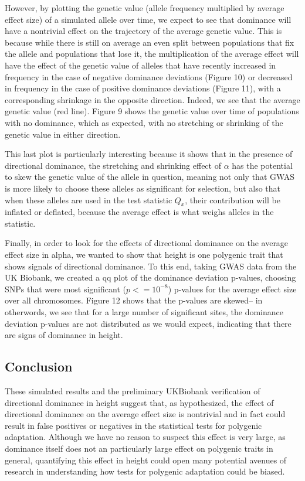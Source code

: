 \documentclass[a4paper,12pt]{article}
\begin{document}
However, by plotting the genetic value (allele frequency multiplied by
average effect size) of a simulated allele over time, we expect to see
that dominance will have a nontrivial effect on the trajectory of the
average genetic value. This is because while there is still on average
an even split between populations that fix the allele and populations
that lose it, the multiplication of the average effect will have the
effect of  the genetic value of alleles that have
recently increased in frequency in the case of negative dominance
deviations (Figure 10) or decreased in frequency in the case of
positive dominance deviations (Figure 11), with a corresponding
shrinkage in the opposite direction. Indeed, we see that the
average genetic value (red line). Figure 9 shows the genetic value
over time of populations with no dominance, which as expected, with no
stretching or shrinking of the genetic value in either direction.

This last plot is particularly interesting because it shows that in
the presence of directional dominance, the stretching and shrinking
effect of $\alpha$ has the potential to skew the genetic value of the
allele in question, meaning not only that GWAS is more likely to
choose these alleles as significant for selection, but also that when
these alleles are used in the test statistic $Q_x$, their contribution
will be inflated or deflated, because the average effect is what
weighs alleles in the statistic.

Finally, in order to look for the effects of directional dominance on
the average effect size in alpha, we wanted to show that height is one
polygenic trait that shows signals of directional dominance. To this
end, taking GWAS data from the UK Biobank, we created a qq plot of the
dominance deviation p-values, choosing SNPs that were 
most significant ($p <= 10^{-8}$) p-values for the average effect size
over all chromosomes. Figure 12 shows that the p-values are skewed--
in otherwords, we see that for a large number of significant sites,
the dominance deviation p-values are not distributed as we would
expect, indicating that there are signs of dominance in height.

\subsection*{Conclusion}
These simulated results and the preliminary UKBiobank verification of
directional dominance in height suggest that, as hypothesized, the
effect of directional dominance on the average effect size is
nontrivial and in fact could result in false positives or negatives in
the statistical tests for polygenic adaptation. Although we have no
reason to suspect this effect is very large, as dominance
itself does not an particularly large effect on polygenic traits in
general, quantifying this effect in height could open many potential
avenues of research in understanding how tests for polygenic
adaptation could be biased.
\end{document}
